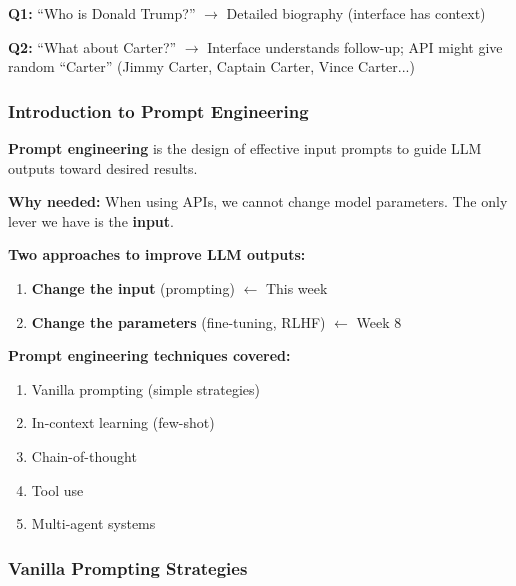 \begin{exbox}
\textbf{Q1:} ``Who is Donald Trump?'' $\to$ Detailed biography (interface has context)

\textbf{Q2:} ``What about Carter?'' $\to$ Interface understands follow-up; API might give random ``Carter'' (Jimmy Carter, Captain Carter, Vince Carter...)
\end{exbox}

\bigseparator

\subsubsection{Introduction to Prompt Engineering}

\begin{defbox}
\textbf{Prompt engineering} is the design of effective input prompts to guide LLM outputs toward desired results.

\textbf{Why needed:} When using APIs, we cannot change model parameters. The only lever we have is the \textbf{input}.

\textbf{Two approaches to improve LLM outputs:}
\begin{enumerate}
  \item \textbf{Change the input} (prompting) $\leftarrow$ This week
  \item \textbf{Change the parameters} (fine-tuning, RLHF) $\leftarrow$ Week 8
\end{enumerate}
\end{defbox}

\textbf{Prompt engineering techniques covered:}
\begin{enumerate}
  \item Vanilla prompting (simple strategies)
  \item In-context learning (few-shot)
  \item Chain-of-thought
  \item Tool use
  \item Multi-agent systems
\end{enumerate}

\bigseparator

\subsubsection{Vanilla Prompting Strategies}

